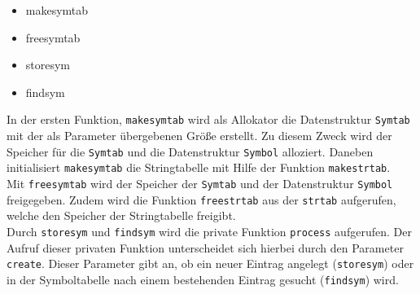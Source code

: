\begin{itemize}
\item makesymtab
\item freesymtab
\item storesym
\item findsym
\end{itemize}
In der ersten Funktion, \texttt{makesymtab} wird als Allokator die Datenstruktur \texttt{Symtab} mit der als Parameter übergebenen Größe erstellt.
Zu diesem Zweck wird der Speicher für die \texttt{Symtab} und die Datenstruktur \texttt{Symbol} alloziert.
Daneben initialisiert \texttt{makesymtab} die Stringtabelle mit Hilfe der Funktion \texttt{makestrtab}. \\
Mit \texttt{freesymtab} wird der Speicher der \texttt{Symtab} und der Datenstruktur \texttt{Symbol} freigegeben.
Zudem wird die Funktion \texttt{freestrtab} aus der \texttt{strtab} aufgerufen, welche den Speicher der Stringtabelle freigibt. \\
Durch \texttt{storesym} und \texttt{findsym} wird die private Funktion \texttt{process} aufgerufen. Der Aufruf dieser privaten Funktion unterscheidet sich hierbei durch den Parameter \texttt{create}.
Dieser Parameter gibt an, ob ein neuer Eintrag angelegt (\texttt{storesym}) oder in der Symboltabelle nach einem bestehenden Eintrag gesucht (\texttt{findsym}) wird.